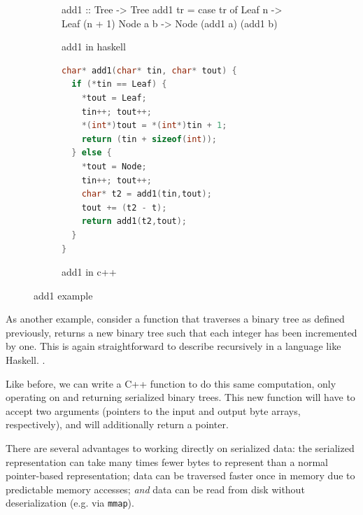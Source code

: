 \documentclass[showabstract,showacknowledgments,showpreface,showdedication]{iuphd}
\theoremstyle{nonumberplain}
\begin{document}
\begin{figure}
  \begin{subfigure}{\textwidth}
\begin{code}
add1 :: Tree -> Tree
add1 tr =
  case tr of
    Leaf n -> Leaf (n + 1)
    Node a b -> Node (add1 a) (add1 b)
\end{code}
    \caption{add1 in haskell}\label{fig:add1-haskell}
  \end{subfigure}

  \begin{subfigure}{\textwidth}
\begin{lstlisting}[language=C++]
char* add1(char* tin, char* tout) {
  if (*tin == Leaf) {
    *tout = Leaf;
    tin++; tout++;
    *(int*)tout = *(int*)tin + 1;
    return (tin + sizeof(int));
  } else {
    *tout = Node;
    tin++; tout++;
    char* t2 = add1(tin,tout);
    tout += (t2 - t);
    return add1(t2,tout);
  }
}
\end{lstlisting}
    \caption{add1 in c++}\label{fig:add1-cpp}
  \end{subfigure}
\caption{add1 example}
\end{figure}

As another example, consider a function that traverses a binary tree as defined
previously, returns a new binary tree such that each integer has been incremented
by one. This is again straightforward to describe recursively in a language
like Haskell. .

Like before, we can write a C++ function to do this same computation, only
operating on and returning serialized binary trees. This new function will
have to accept two arguments (pointers to the input and output byte arrays,
respectively), and will additionally return a pointer. 


There are several advantages to working directly on serialized data: the
serialized representation can take many times fewer bytes to represent than
a normal pointer-based representation; data can be traversed faster once in
memory due to predictable memory accesses; \emph{and} data can be read from
disk without deserialization (e.g. via \texttt{mmap}).
%
\end{document}
